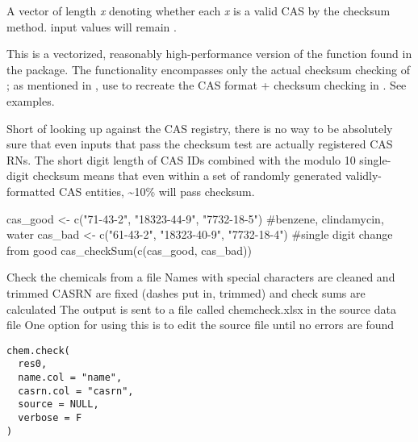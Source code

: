 \documentclass[letterpaper]{book}
\begin{document}
%
\begin{Value}
A  vector of length \emph{x} denoting whether each \emph{x} is a valid CAS by the checksum method. 
input values will remain .
\end{Value}
%
\begin{Note}\relax
This is a vectorized, reasonably high-performance version of the  function found
in the  package. The functionality encompasses only the actual checksum checking of ;
as mentioned in , use  to recreate the CAS format + checksum checking in
. See examples.

Short of looking up against the CAS registry, there is no way to be absolutely sure that even inputs that pass
the checksum test are actually registered CAS RNs. The short digit length of CAS IDs combined with the modulo 10 single-
digit checksum means that even within a set of randomly generated validly-formatted CAS entities, \textasciitilde{}10\% will pass checksum.
\end{Note}
%
\begin{Examples}
\begin{ExampleCode}
cas_good <- c("71-43-2", "18323-44-9", "7732-18-5") #benzene, clindamycin, water
cas_bad  <- c("61-43-2", "18323-40-9", "7732-18-4") #single digit change from good
cas_checkSum(c(cas_good, cas_bad))
\end{ExampleCode}
\end{Examples}
%
\begin{Description}\relax
Check the chemicals from a file
Names with special characters are cleaned and trimmed
CASRN are fixed (dashes put in, trimmed) and check sums are calculated
The output is sent to a file called chemcheck.xlsx in the source data file
One option for using this is to edit the source file until no errors are found
\end{Description}
%
\begin{Usage}
\begin{verbatim}
chem.check(
  res0,
  name.col = "name",
  casrn.col = "casrn",
  source = NULL,
  verbose = F
)
\end{verbatim}
\end{Usage}
\end{document}
